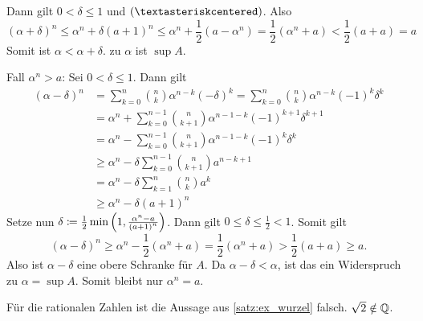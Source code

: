 \documentclass[../ana1.tex]{subfiles}
\begin{document}
\begin{bew}
\begin{faelle}
			Dann gilt \(0<\delta\leq 1\) und \((\textasteriskcentered) \). Also
			\[ {(\alpha + \delta)}^n \leq \alpha^n + \delta {(a+1)}^n \leq \alpha^n + \frac{1}{2} (a-\alpha^n) = \frac{1}{2} (\alpha^n+a) < \frac{1}{2} (a+a) =a \]
			Somit ist \(\alpha < \alpha + \delta \). \Lightning{} zu \(\alpha \) ist \(\sup A\). \\
		\item[Fall \(\alpha^n > a\):] Sei \(0 < \delta \leq 1 \). Dann gilt
			\!\begin{align*}
				{(\alpha - \delta)}^n & = \sum_{k=0}^{n} \binom{n}{k} \alpha^{n-k} {(-\delta)}^k = \sum_{k=0}^{n} \binom{n}{k} \alpha^{n-k} {(-1)}^k\delta^k \\
								      & = \alpha^n + \sum_{k=0}^{n-1} \binom{n}{k+1} \alpha^{n-1-k} {(-1)}^{k+1}\delta^{k+1} \\
								   	  & = \alpha^n - \sum_{k=0}^{n-1} \binom{n}{k+1} \alpha^{n-1-k} {(-1)}^{k} \delta^k \\
									  & \geq \alpha^n - \delta \sum_{k=0}^{n-1} \binom{n}{k+1} a^{n-k+1} \\
									  & = \alpha^n - \delta \sum_{k=1}^{n} \binom{n}{k} a^k \\
					 				  & \geq \alpha^n - \delta {(a+1)}^n
			\end{align*}
			Setze nun \( \delta \coloneqq \frac{1}{2} \min \left(1 , \frac{\alpha^n-a}{{(a+1)}^n} \right) \). Dann gilt \(0 \leq \delta \leq \frac{1}{2} < 1 \). Somit gilt
			\[{(\alpha -\delta)}^n \geq \alpha^n - \frac{1}{2} (\alpha^n + a) = \frac{1}{2} (\alpha^n + a) > \frac{1}{2} (a + a) \geq a. \]
			Also ist \( \alpha - \delta \) eine obere Schranke für \(A \). Da \(\alpha - \delta < \alpha \), ist das ein Widerspruch zu \(\alpha = \sup A\). Somit bleibt nur \(\alpha^n = a\).
	\end{faelle}
\end{bew}

\begin{bem}
	Für die rationalen Zahlen ist die Aussage aus \autoref{satz:ex_wurzel} falsch. \zB{} \(\sqrt{2} \notin \mathbb{Q} \).
\end{bem}
\end{document}
